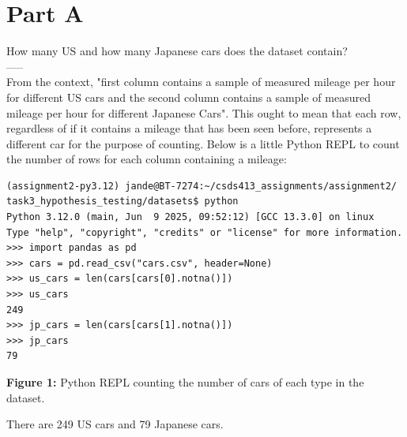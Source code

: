 \section{Part A}
How many US and how many Japanese cars does the dataset contain?\\
-----\\

From the context, "first column contains a sample of measured mileage per
hour for different US cars and the second column contains a sample of measured mileage per hour for different Japanese Cars". This ought to mean that each row, regardless of if it contains a mileage that has been seen before, represents a different car for the purpose of counting. Below is a little Python REPL to count the number of rows for each column containing a mileage:

\begin{verbatim}
(assignment2-py3.12) jande@BT-7274:~/csds413_assignments/assignment2/
task3_hypothesis_testing/datasets$ python
Python 3.12.0 (main, Jun  9 2025, 09:52:12) [GCC 13.3.0] on linux
Type "help", "copyright", "credits" or "license" for more information.
>>> import pandas as pd
>>> cars = pd.read_csv("cars.csv", header=None)
>>> us_cars = len(cars[cars[0].notna()])
>>> us_cars
249
>>> jp_cars = len(cars[cars[1].notna()])
>>> jp_cars
79
\end{verbatim}

\begin{center}
\textbf{Figure 1:} Python REPL counting the number of cars of each type in the dataset.\\
\end{center}

There are 249 US cars and 79 Japanese cars.

\newpage
